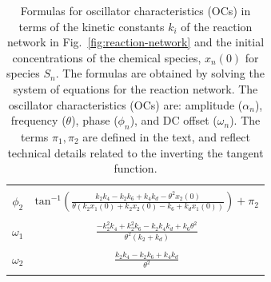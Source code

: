 \documentclass{bmcart}
\newcommand{\fig}[1]{Fig.~\ref{#1}}
\begin{document}
\begin{backmatter}
\begin{table}[]
\begin{tabular}{||c|c||}
         & \\
         $\phi_2$ & $\operatorname{tan^{-1}}{\left(\frac{k_{2} k_{4} - k_{2} k_{6} + k_{4} k_{d} - \theta^{2} x_2 (0)}{\theta \left(k_{2} x_1 (0) + k_{2} x_2 (0) - k_{6} + k_{d} x_1 (0)\right)} \right)} + \pi_2 $ \\
         & \\
         $\omega_1$ & $\frac{- k_{2}^{2} k_{4} + k_{2}^{2} k_{6} - k_{2} k_{4} k_{d} + k_{6} \theta^{2}}{\theta^2 (k_{2} + k_{d})}$ \\
         & \\
         $\omega_2$ & $\frac{k_{2} k_{4} - k_{2} k_{6} + k_{4} k_{d}}{\theta^{2}}$ \\
         & \\
         \hline
    \end{tabular}
    \vspace{0.05in}
    \caption{Formulas for oscillator characteristics (OCs) in terms of the kinetic constants $k_i$ of the reaction network in \fig{fig:reaction-network} and the initial concentrations of the chemical species, $x_n(0)$ for species $S_n$. The formulas are obtained by solving the system of equations for the reaction network. The oscillator characteristics (OCs) are: amplitude ($\alpha_n$), frequency ($\theta$), phase ($\phi_n$), and DC offset ($\omega_n$). The terms $\pi_1, \pi_2$ are defined in the text, and reflect technical details related to the inverting the tangent function.} 
    \label{tab:oc}
\end{table}




\end{backmatter}
\end{document}
